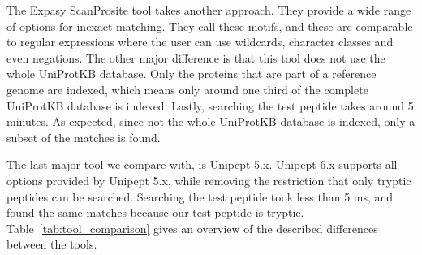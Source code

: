 \documentclass[11pt]{article}
\newenvironment{Table}
{\par\medskip\noindent\minipage{\linewidth}}
{\endminipage\par\medskip}
\begin{document}
\begin{multicols}{2}
        The Expasy ScanProsite tool takes another approach.
        They provide a wide range of options for inexact matching.
        They call these motifs, and these are comparable to regular expressions where the user can use wildcards, character classes and even negations.
        The other major difference is that this tool does not use the whole UniProtKB database.
        Only the proteins that are part of a reference genome are indexed, which means only around one third of the complete UniProtKB database is indexed.
        Lastly, searching the test peptide takes around 5 minutes.
        As expected, since not the whole UniProtKB database is indexed, only a subset of the matches is found.

        The last major tool we compare with, is Unipept 5.x.
        Unipept 6.x supports all options provided by Unipept 5.x, while removing the restriction that only tryptic peptides can be searched.
        Searching the test peptide took less than 5 ms, and found the same matches because our test peptide is tryptic.
        Table~\ref{tab:tool_comparison} gives an overview of the described differences between the tools.

        \begin{Table}
            \centering
            \label{tab:tool_comparison}
        \end{Table}


\end{multicols}
\end{document}
